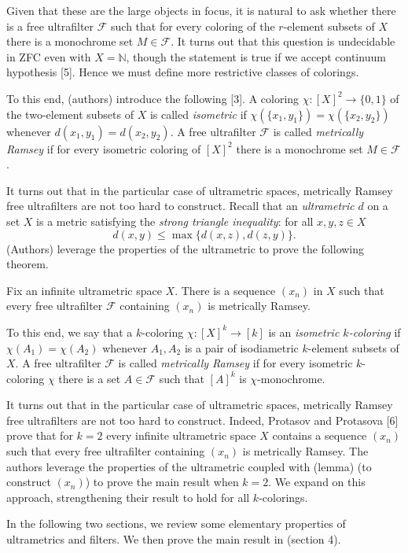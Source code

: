 Given that these are the large objects in focus, it is natural to ask whether there is a free ultrafilter \( \mathcal{F}  \) such that for every coloring of the \( r \)-element subsets of \( X \) there is a monochrome set \( M \in \mathcal{F}  \). It turns out that this question is undecidable in ZFC even with \( X = \mathbb{N}  \), though the statement is true if we accept continuum hypothesis [5]. Hence we must define more restrictive classes of colorings.

To this end, (authors) introduce the following [3]. A coloring \( \chi : [X]^{2} \to \{ 0 , 1 \}  \) of the two-element subsets of \( X \) is called \emph{isometric} if \( \chi (\{ x_1, y_1 \} ) = \chi (\{ x_2, y_2 \} ) \) whenever \( d(x_1, y_1) = d(x_2, y_2) \). A free ultrafilter \( \mathcal{F}  \) is called \emph{metrically Ramsey} if for every isometric coloring of \( [X]^{2}  \) there is a monochrome set \( M \in \mathcal{F}  \).

It turns out that in the particular case of ultrametric spaces, metrically Ramsey free ultrafilters are not too hard to construct. Recall that an \emph{ultrametric} \( d \) on a set \( X \) is a metric satisfying the \emph{strong triangle inequality}: for all \( x,y,z \in X \) \[ d(x,y) \leq \max \{ d(x,z), d(z,y) \}.  \] (Authors) leverage the properties of the ultrametric to prove the following theorem.

\begin{theorem}
Fix an infinite ultrametric space \( X \). There is a sequence \( (x_{n}) \) in \( X \) such that every free ultrafilter \( \mathcal{F}  \) containing \( (x_{n}) \) is metrically Ramsey.
\end{theorem}


\newpage

To this end, we say that a \( k \)-coloring \( \chi : [X]^{k} \to [k]  \) is an \emph{isometric \( k \)-coloring} if \( \chi (A_1) = \chi (A_2) \) whenever \( A_1, A_2 \) is a pair of isodiametric \( k \)-element subsets of \( X \). A free ultrafilter \( \mathcal{F}  \) is called \emph{metrically Ramsey} if for every isometric \( k \)-coloring \( \chi \) there is a set \( A \in \mathcal{F}  \) such that \( [A]^{k}  \) is \( \chi \)-monochrome.

It turns out that in the particular case of ultrametric spaces, metrically Ramsey free ultrafilters are not too hard to construct. Indeed, Protasov and Protasova [6] prove that for \( k = 2 \) every infinite ultrametric space \( X \) contains a sequence \( (x_{n}) \) such that every free ultrafilter containing \( (x_{n}) \) is metrically Ramsey. The authors leverage the properties of the ultrametric coupled with (lemma) (to construct \( (x_{n}) \)) to prove the main result when \( k = 2 \). We expand on this approach, strengthening their result to hold for all \( k \)-colorings.

In the following two sections, we review some elementary properties of ultrametrics and filters. We then prove the main result in (section 4).

